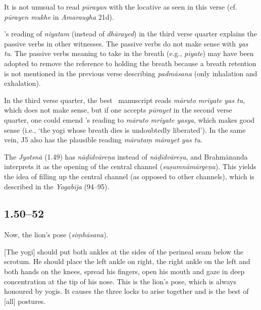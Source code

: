 \begin{ekdosis}
\begin{testimonia}[hp01_049]
\end{testimonia}

\begin{philcomm}[hp01_049]
It is not unusual to read \emph{pūrayan} with the locative as seen in this verse (cf. \emph{pūrayen mukhe} in \emph{Amaraugha} 21d). 

\gammaOne's reading of \emph{niyatam} (instead of \emph{dhārayed}) in the third verse quarter explains the passive verbs in other witnesses. The passive verbs do not make sense with \emph{yas tu}. The passive verbs meaning to take in the breath (e.g., \emph{pīyate}) may have been adopted to remove the reference to holding the breath because a breath retention is not mentioned in the previous verse describing \emph{padmāsana} (only inhalation and exhalation). 

In the third verse quarter, the best \textalpha\ manuscript reads \emph{māruto mriyate yas tu}, which does not make sense, but if one accepts \emph{pūrayet} in the second verse quarter, one could emend \textalpha's reading to \emph{māruto mriyate yasya}, which makes good sense (i.e., `the yogi whose breath dies is undoubtedly liberated'). In the same vein, J5 also has the plausible reading \emph{mārutaṃ mārayet yas tu}. 


The \emph{Jyotsnā} (1.49) has \emph{nāḍīdvāreṇa} instead of \emph{nāḍīdvāreṣu}, and Brahmānanda interprets it as the opening of the central channel (\emph{suṣumnāmārgeṇa}). This yields the idea of filling up the central channel (as opposed to other channels), which is described in the \emph{Yogabīja} (94–95). 
\end{philcomm}

\subsection*{1.50--52}
\begin{translation}[hp01_050]
Now, the lion’s pose (\emph{siṃhāsana}).

[The yogi] should put both ankles at the sides of the perineal seam below the scrotum. He should place the left ankle on right, the right ankle on the left and both hands on the knees, spread his fingers, open his mouth and gaze in deep concentration at the tip of his nose. This is the lion’s pose, which is always honoured by yogis. It causes the three locks to arise together and is the best of [all] postures.
\end{translation}


\end{ekdosis}
